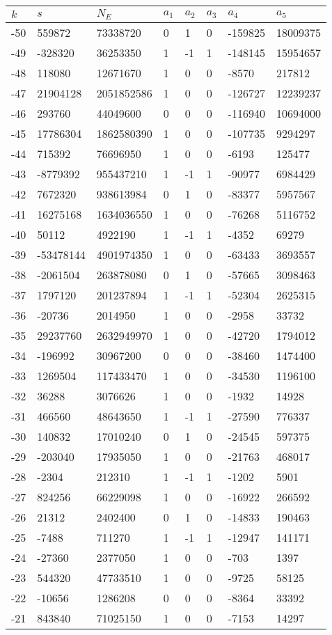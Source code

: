 \documentclass{amsart}
\begin{document}
\begin{longtable}{|l|l|l|lllll|}
\hline
$k$ & $s$ & $N_E$ & $a_1$ & $a_2$ & $a_3$ & $a_4$ & $a_5$\\
\hline
-50&559872&73338720&0&1&0&-159825&18009375\\
-49&-328320&36253350&1&-1&1&-148145&15954657\\
-48&118080&12671670&1&0&0&-8570&217812\\
-47&21904128&2051852586&1&0&0&-126727&12239237\\
-46&293760&44049600&0&0&0&-116940&10694000\\
-45&17786304&1862580390&1&0&0&-107735&9294297\\
-44&715392&76696950&1&0&0&-6193&125477\\
-43&-8779392&955437210&1&-1&1&-90977&6984429\\
-42&7672320&938613984&0&1&0&-83377&5957567\\
-41&16275168&1634036550&1&0&0&-76268&5116752\\
-40&50112&4922190&1&-1&1&-4352&69279\\
-39&-53478144&4901974350&1&0&0&-63433&3693557\\
-38&-2061504&263878080&0&1&0&-57665&3098463\\
-37&1797120&201237894&1&-1&1&-52304&2625315\\
-36&-20736&2014950&1&0&0&-2958&33732\\
-35&29237760&2632949970&1&0&0&-42720&1794012\\
-34&-196992&30967200&0&0&0&-38460&1474400\\
-33&1269504&117433470&1&0&0&-34530&1196100\\
-32&36288&3076626&1&0&0&-1932&14928\\
-31&466560&48643650&1&-1&1&-27590&776337\\
-30&140832&17010240&0&1&0&-24545&597375\\
-29&-203040&17935050&1&0&0&-21763&468017\\
-28&-2304&212310&1&-1&1&-1202&5901\\
-27&824256&66229098&1&0&0&-16922&266592\\
-26&21312&2402400&0&1&0&-14833&190463\\
-25&-7488&711270&1&-1&1&-12947&141171\\
-24&-27360&2377050&1&0&0&-703&1397\\
-23&544320&47733510&1&0&0&-9725&58125\\
-22&-10656&1286208&0&0&0&-8364&33392\\
-21&843840&71025150&1&0&0&-7153&14297\\

\end{longtable}
\end{document}

